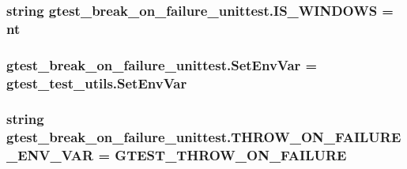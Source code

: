\subsubsection[{\texorpdfstring{I\+S\+\_\+\+W\+I\+N\+D\+O\+WS}{IS_WINDOWS}}]{\setlength{\rightskip}{0pt plus 5cm}string gtest\+\_\+break\+\_\+on\+\_\+failure\+\_\+unittest.\+I\+S\+\_\+\+W\+I\+N\+D\+O\+WS = \textquotesingle{}nt\textquotesingle{}}\hypertarget{namespacegtest__break__on__failure__unittest_aec67fcd1a946db2d8c747f6519a5bb05}{}\label{namespacegtest__break__on__failure__unittest_aec67fcd1a946db2d8c747f6519a5bb05}
\subsubsection[{\texorpdfstring{Set\+Env\+Var}{SetEnvVar}}]{\setlength{\rightskip}{0pt plus 5cm}gtest\+\_\+break\+\_\+on\+\_\+failure\+\_\+unittest.\+Set\+Env\+Var = gtest\+\_\+test\+\_\+utils.\+Set\+Env\+Var}\hypertarget{namespacegtest__break__on__failure__unittest_a6d10069714f75f3f755c1d2c9c0ddd15}{}\label{namespacegtest__break__on__failure__unittest_a6d10069714f75f3f755c1d2c9c0ddd15}
\subsubsection[{\texorpdfstring{T\+H\+R\+O\+W\+\_\+\+O\+N\+\_\+\+F\+A\+I\+L\+U\+R\+E\+\_\+\+E\+N\+V\+\_\+\+V\+AR}{THROW_ON_FAILURE_ENV_VAR}}]{\setlength{\rightskip}{0pt plus 5cm}string gtest\+\_\+break\+\_\+on\+\_\+failure\+\_\+unittest.\+T\+H\+R\+O\+W\+\_\+\+O\+N\+\_\+\+F\+A\+I\+L\+U\+R\+E\+\_\+\+E\+N\+V\+\_\+\+V\+AR = \textquotesingle{}G\+T\+E\+S\+T\+\_\+\+T\+H\+R\+O\+W\+\_\+\+O\+N\+\_\+\+F\+A\+I\+L\+U\+RE\textquotesingle{}}\hypertarget{namespacegtest__break__on__failure__unittest_ac5edd000e7dc4212c8c7ce947ebd3b72}{}\label{namespacegtest__break__on__failure__unittest_ac5edd000e7dc4212c8c7ce947ebd3b72}
